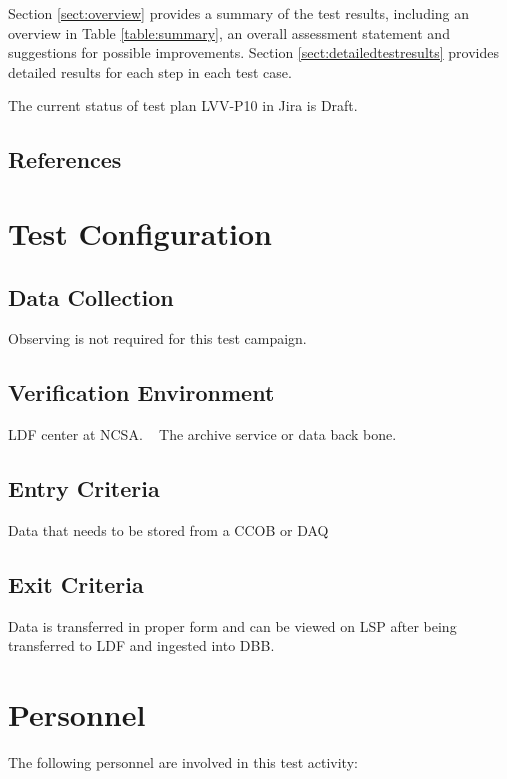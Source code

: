 \documentclass[DM,lsstdraft,STR,toc]{lsstdoc}
\begin{document}
Section \ref{sect:overview} provides a summary of the test results, including an overview in Table \ref{table:summary}, an overall assessment statement and suggestions for possible improvements.
Section \ref{sect:detailedtestresults} provides detailed results for each step in each test case.

The current status of test plan LVV-P10 in Jira is Draft.

\subsection{References}
\label{sect:references}
\renewcommand{\refname}{}

\section{Test Configuration}
\label{sect:configuration}

\subsection{Data Collection}

  Observing is not required for this test campaign.

\subsection{Verification Environment}
\label{sect:hwconf}
  LDF center at NCSA. ~ The archive service or data back bone.~~


  \subsection{Entry Criteria}
  Data that needs to be stored from a CCOB or DAQ


  \subsection{Exit Criteria}
  Data is transferred in proper form and can be viewed on LSP after being
transferred to LDF and ingested into DBB.~~



\section{Personnel}
\label{sect:personnel}

The following personnel are involved in this test activity:
\end{document}
